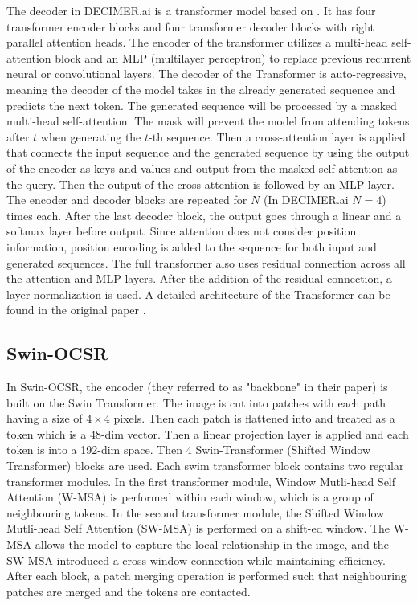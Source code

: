 \documentclass[conference]{IEEEtran}
\begin{document}
The decoder in DECIMER.ai is a transformer model based on \cite{attention_is_all_you_need}. It has four transformer encoder blocks and four transformer decoder blocks with right parallel attention heads. \cite{decimer} The encoder of the transformer utilizes a multi-head self-attention block and an MLP (multilayer perceptron) to replace previous recurrent neural or convolutional layers. The decoder of the Transformer is auto-regressive, meaning the decoder of the model takes in the already generated sequence and predicts the next token. The generated sequence will be processed by a masked multi-head self-attention. The mask will prevent the model from attending tokens after $t$ when generating the $t$-th sequence. Then a cross-attention layer is applied that connects the input sequence and the generated sequence by using the output of the encoder as keys and values and output from the masked self-attention as the query. Then the output of the cross-attention is followed by an MLP layer. The encoder and decoder blocks are repeated for $N$ (In DECIMER.ai $N=4$) times each. After the last decoder block, the output goes through a linear and a softmax layer before output. Since attention does not consider position information, position encoding is added to the sequence for both input and generated sequences. The full transformer also uses residual connection across all the attention and MLP layers. After the addition of the residual connection, a layer normalization is used. A detailed architecture of the Transformer can be found in the original paper \cite{attention_is_all_you_need}.

\subsection{Swin-OCSR}
In Swin-OCSR, the encoder (they referred to as "backbone" in their paper) is built on the Swin Transformer. The image is cut into patches with each path having a size of $4 \times 4$ pixels. Then each patch is flattened into and treated as a token which is a 48-dim vector. Then a linear projection layer is applied and each token is into a 192-dim space. 
Then 4 Swin-Transformer (Shifted Window Transformer) \cite{swin_tran} blocks are used. Each swim transformer block contains two regular transformer modules. In the first transformer module, Window Mutli-head Self Attention (W-MSA) is performed within each window, which is a group of neighbouring tokens. In the second transformer module, the Shifted Window Mutli-head Self Attention (SW-MSA) is performed on a shift-ed window. The W-MSA allows the model to capture the local relationship in the image, and the SW-MSA introduced a cross-window connection while maintaining efficiency. After each block, a patch merging operation is performed such that neighbouring patches are merged and the tokens are contacted. \cite{swin_tran} \cite{swinocsr}
\end{document}
